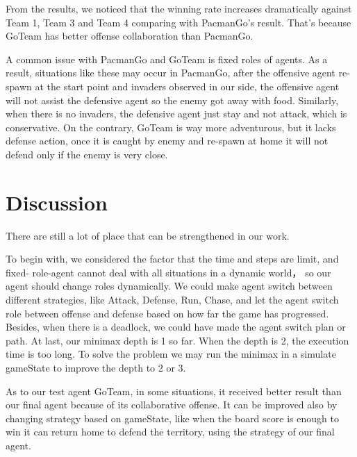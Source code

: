 From the results, we noticed that the winning rate increases dramatically against Team 1, 
Team 3 and Team 4 comparing with PacmanGo's result. That's because GoTeam has better 
offense collaboration than PacmanGo. 

A common issue with PacmanGo and GoTeam is
fixed roles of agents. As a result, situations like these may occur in PacmanGo, after 
the offensive agent re-spawn at the start point and invaders observed in our side, the 
offensive agent will not assist the defensive agent so the enemy got away with food. 
Similarly, when there is no invaders, the defensive agent just stay and not attack, which
is conservative. On the contrary, GoTeam is way more adventurous, but it lacks defense 
action, once it is caught by enemy and re-spawn at home it will not defend only if the 
enemy is very close.

\section{Discussion}
There are still a lot of place that can be strengthened in our work.

To begin with, we considered the factor that the time and steps are limit, and fixed- 
role-agent cannot deal with all situations in a dynamic world， so our 
agent should change roles dynamically.  We could make agent switch between
different strategies, like Attack, Defense, Run, Chase, and let the agent
switch role between offense and defense based on how far the game has
progressed. Besides, when there is a deadlock, we could have made the agent 
switch plan or path. At last, our minimax depth is 1 so far. When the depth 
is 2, the execution time is too long. To solve the problem we may run the 
minimax in a simulate gameState to improve the depth to 2 or 3.

As to our test agent GoTeam, in some situations, it received better result than our final
agent because of its collaborative offense.  It can be improved also by changing 
strategy based on gameState, like when the board score is enough to win it can return
home to defend the territory, using the strategy of our final agent.

